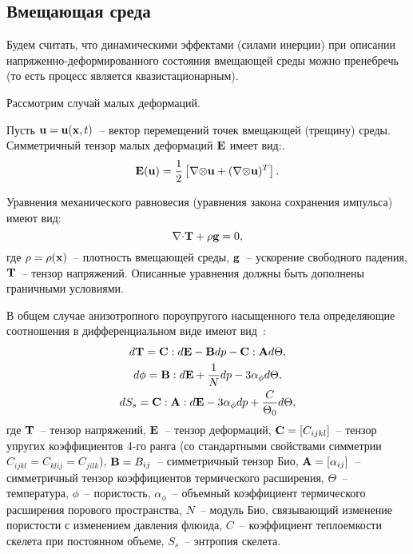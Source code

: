 
\subsection{Вмещающая среда}\label{sec:poroelast}


Будем считать, что динамическими эффектами (силами инерции) при
описании напряженно-деформированного состояния вмещающей среды можно
пренебречь (то есть процесс является квазистационарным).

Рассмотрим случай малых деформаций.

Пусть ${\mathbf{u}} = {\mathbf{u}}(\mathbf{x},t)$~-- вектор перемещений точек вмещающей
(трещину) среды.  Симметричный тензор малых деформаций $\mathbf{E}$ имеет
вид:.%
%
\begin{equation*} 
\mathbf{E}(\mathbf{u}) = \frac{1}{2} \left[\mathbf{\nabla} \mathbf{\otimes} \mathbf{u} + (\mathbf{\nabla}\mathbf{\otimes} \mathbf{u} )^{T} \right].  
\end{equation*} 


Уравнения механического равновесия (уравнения закона сохранения
импульса) имеют вид:
%
\begin{equation} 
\label{eq:equil} %
\mathbf{\nabla} \dpr \tn{T} + \rho \vc{g} = 0, 
\end{equation} 
где $\rho = \rho(\mathbf{x})$~-- плотность вмещающей среды, $\mathbf{g}$~-- ускорение свободного падения,
$\mathbf{T}$~-- тензор напряжений.
%
Описанные уравнения должны быть дополнены граничными условиями.

В общем случае анизотропного пороупругого насыщенного тела определяющие соотношения 
в дифференциальном виде имеют вид~\cite{coussy_2004}:
%
\begin{gather}
d\mathbf{T} = \mathbf{C}:d\mathbf{E} - \mathbf{B}dp - \mathbf{C}:\mathbf{A}d\Theta, \label{eq:dsigma}\\
d\phi = \mathbf{B}:d\mathbf{E} + \frac{1}{N} dp - 3\alpha_\phi d\Theta, \label{eq:dphi} \\
dS_s  = \mathbf{C} : \mathbf{A} : d\mathbf{E} - 3\alpha_\phi dp + \frac{C}{\Theta_0}d\Theta\label{eq:ds},
\end{gather}
%
где
%
$\mathbf{T}$~-- тензор напряжений, 
$\mathbf{E}$~-- тензор деформаций,
$\mathbf{C} = [C_{ijkl}]$~-- тензор упругих коэффициентов 4-го ранга (со стандартными свойствами симметрии $C_{ijkl}=C_{klij}=C_{jilk}$),
$\mathbf{B} = B_{ij}$~-- симметричный тензор Био, 
$\mathbf{A}=[\alpha_{ij}]$~-- симметричный тензор коэффициентов термического расширения, 
$\Theta$~-- температура, 
$\phi$~-- пористость,
$\alpha_\phi$~-- объемный коэффициент термического расширения порового пространства,
$N$~-- модуль Био, связывающий изменение пористости с изменением давления флюида, 
$C$~--  коэффициент теплоемкости скелета при постоянном объеме, 
$S_s$~-- энтропия скелета. 

